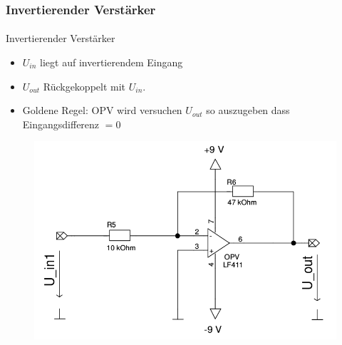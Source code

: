 \begin{frame}
\frametitle{Invertierender Verstärker}
\framesubtitle{}
    \begin{block}{Invertierender Verstärker}
        \begin{itemize}
                \item $U_{in}$ liegt auf invertierendem Eingang
                \item $U_{out}$ Rückgekoppelt mit $U_{in}$.
                \item Goldene Regel: OPV wird versuchen $U_{out}$ so auszugeben
                dass Eingangsdifferenz $=0$
        \end{itemize}
    \end{block}
            \begin{figure}[H]
            \begin{center}
                    \includegraphics[scale=0.2]{./img/schaltung/inv_verst_0.png}
            \end{center}
            \end{figure}
\end{frame}


